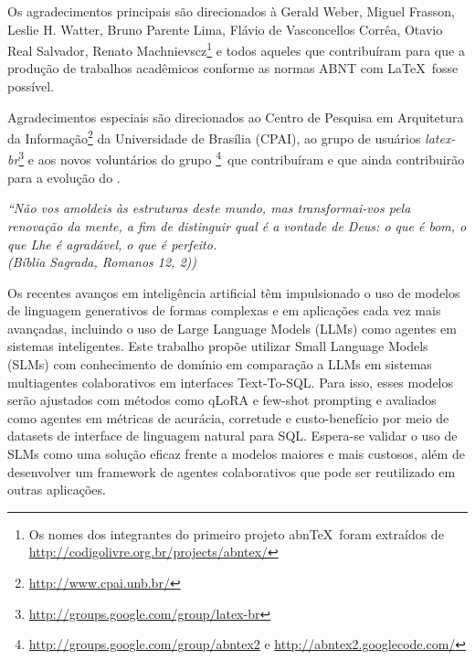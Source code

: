 \documentclass[
	12pt,				%
	openright,			%
	oneside,			%
	a4paper,			%
	dissertacao,			%
	]{ABNT-DC-UEL}
\begin{document}
\begin{agradecimentos}
  Os agradecimentos principais são direcionados à Gerald Weber, Miguel Frasson,
  Leslie H. Watter, Bruno Parente Lima, Flávio de Vasconcellos Corrêa, Otavio Real
  Salvador, Renato Machnievscz\footnote{Os nomes dos integrantes do primeiro
    projeto abn\TeX\ foram extraídos de
    \url{http://codigolivre.org.br/projects/abntex/}} e todos aqueles que
  contribuíram para que a produção de trabalhos acadêmicos conforme
  as normas ABNT com \LaTeX\ fosse possível.

  Agradecimentos especiais são direcionados ao Centro de Pesquisa em Arquitetura
  da Informação\footnote{\url{http://www.cpai.unb.br/}} da Universidade de
  Brasília (CPAI), ao grupo de usuários
  \emph{latex-br}\footnote{\url{http://groups.google.com/group/latex-br}} e aos
  novos voluntários do grupo
  \emph{\abnTeX}\footnote{\url{http://groups.google.com/group/abntex2} e
    \url{http://abntex2.googlecode.com/}}~que contribuíram e que ainda
  contribuirão para a evolução do \abnTeX.

\end{agradecimentos}

\begin{epigrafe}
  \vspace*{\fill}
  \hspace{.4\textwidth}
  \begin{minipage}{.5\textwidth}
    \begin{flushright}
      \textit{
        ``Não vos amoldeis às estruturas deste mundo,
        mas transformai-vos pela renovação da mente,
        a fim de distinguir qual é a vontade de Deus:
        o que é bom, o que Lhe é agradável, o que é perfeito.\\
        (Bíblia Sagrada, Romanos 12, 2))}
    \end{flushright}
  \end{minipage}
\end{epigrafe}


\begin{resumo}
  Os recentes avanços em inteligência artificial têm impulsionado o uso de modelos de linguagem generativos de formas complexas e em aplicações cada vez mais avançadas, incluindo o uso de Large Language Models (LLMs) como agentes em sistemas inteligentes. Este trabalho propõe utilizar Small Language Models (SLMs) com conhecimento de domínio em comparação a LLMs em sistemas multiagentes colaborativos em interfaces Text-To-SQL. Para isso, esses modelos serão ajustados com métodos como qLoRA e few-shot prompting e avaliados como agentes em métricas de acurácia, corretude e custo-benefício por meio de datasets de interface de linguagem natural para SQL. Espera-se validar o uso de SLMs como uma solução eficaz frente a modelos maiores e mais custosos, além de desenvolver um framework de agentes colaborativos que pode ser reutilizado em outras aplicações.
\end{resumo}
\end{document}
